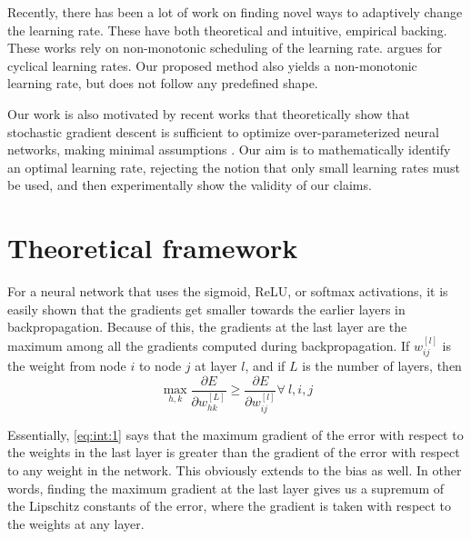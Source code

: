 \documentclass{article}
\begin{document}
Recently, there has been a lot of work on finding novel ways to adaptively change the learning rate. These have both theoretical \cite{seong2018towards} and intuitive, empirical \cite{smith2017super, smith2017cyclical} backing. These works rely on non-monotonic scheduling of the learning rate. \cite{smith2017cyclical} argues for cyclical learning rates. Our proposed method also yields a non-monotonic learning rate, but does not follow any predefined shape.

Our work is also motivated by recent works that theoretically show that stochastic gradient descent is sufficient to optimize over-parameterized neural networks, making minimal assumptions \cite{zou2018stochastic,du2018gradient}. Our aim is to mathematically identify an optimal learning rate, rejecting the notion that only small learning rates must be used, and then experimentally show the validity of our claims.

\section{Theoretical framework}
For a neural network that uses the sigmoid, ReLU, or softmax activations, it is easily shown that the gradients get smaller towards the earlier layers in backpropagation. Because of this, the gradients at the last layer are the maximum among all the gradients computed during backpropagation. If $w^{[l]}_{ij}$ is the weight from node $i$ to node $j$ at layer $l$, and if $L$ is the number of layers, then
\begin{equation}
	\max\limits_{h, k} \frac{\partial E}{\partial w^{[L]}_{hk}} \geq \frac{\partial E}{\partial w^{[l]}_{ij}} \forall\  l, i, j \label{eq:int:1}
\end{equation}

Essentially, \eqref{eq:int:1} says that the maximum gradient of the error with respect to the weights in the last layer is greater than the gradient of the error with respect to any weight in the network. This obviously extends to the bias as well. In other words, finding the maximum gradient at the last layer gives us a supremum of the Lipschitz constants of the error, where the gradient is taken with respect to the weights at any layer.
\end{document}
